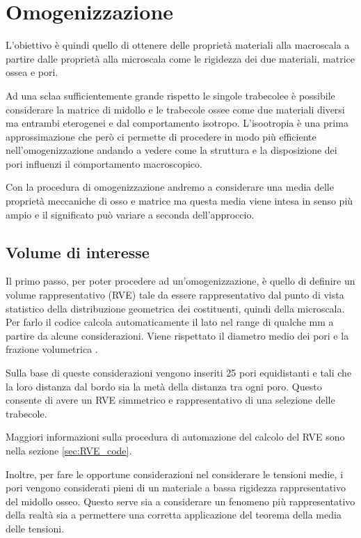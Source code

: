 \documentclass[a4paper,num-refs]{oup-contemporary}
\begin{document}
\section{Omogenizzazione}

L'obiettivo è quindi quello di ottenere delle proprietà materiali alla macroscala a partire dalle proprietà alla microscala come le rigidezza dei due materiali, matrice ossea e pori.

Ad una sclaa sufficientemente grande rispetto le singole trabecolee è possibile considerare la matrice di midollo e le trabecole ossee come due materiali diversi ma entrambi eterogenei e dal comportamento isotropo. L'isootropia è una prima approssimazione che però ci permette di procedere in modo più efficiente nell'omogenizzazione andando a vedere come la struttura e la disposizione dei pori influenzi il comportamento macroscopico. 

Con la procedura di omogenizzazione andremo a considerare una media delle proprietà meccaniche di osso e matrice ma questa media viene intesa in senso più ampio e il significato può variare a seconda dell'approccio. 

\subsection{Volume di interesse}
\label{sec:RVE}

Il primo passo, per poter procedere ad un'omogenizzazione, è quello di definire un volume rappresentativo (RVE) tale da essere rappresentativo dal punto di vista statistico della distribuzione geometrica dei costituenti, quindi della microscala. Per farlo il codice calcola automaticamente il lato nel range di qualche mm a partire da alcune considerazioni. Viene rispettato il diametro medio dei pori \citep{Doktor:2011} e la frazione volumetrica  \citep{Cowin1}. 

Sulla base di queste considerazioni vengono inseriti 25 pori equidistanti e tali che la loro distanza dal bordo sia la metà della distanza tra ogni poro. Questo consente di avere un RVE simmetrico e rappresentativo di una selezione delle trabecole. 

Maggiori informazioni sulla procedura di automazione del calcolo del RVE sono nella sezione \ref{sec:RVE_code}.

Inoltre, per fare le opportune considerazioni nel considerare le tensioni medie, i pori vengono considerati pieni di un materiale a bassa rigidezza rappresentativo del midollo osseo. Questo serve sia a considerare un fenomeno più rappresentativo della realtà sia a permettere una corretta applicazione del teorema della media delle tensioni. 
\end{document}
